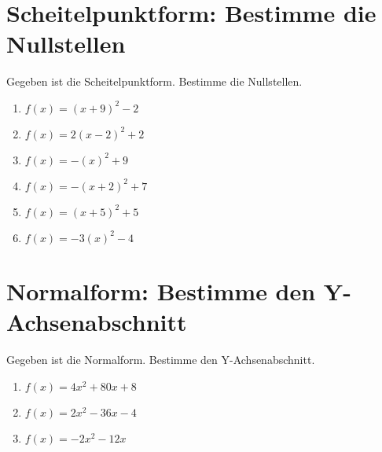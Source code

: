 \documentclass{article}%
\begin{document}
\section{Scheitelpunktform: Bestimme die Nullstellen}%
\label{sec:ScheitelpunktformBestimmedieNullstellen}%
Gegeben ist die Scheitelpunktform. Bestimme die Nullstellen.%
\begin{enumerate}[label=\alph*)]%
\item%
\newline\vspace{0.5cm} $f(x)=(x+9)^2 -2$%
\item%
\newline\vspace{0.5cm} $f(x)=2(x-2)^2 +2$%
\item%
\newline\vspace{0.5cm} $f(x)=-(x)^2 +9$%
\item%
\newline\vspace{0.5cm} $f(x)=-(x+2)^2 +7$%
\item%
\newline\vspace{0.5cm} $f(x)=(x+5)^2 +5$%
\item%
\newline\vspace{0.5cm} $f(x)=-3(x)^2 -4$%
\end{enumerate}

%
\section{Normalform: Bestimme den Y{-}Achsenabschnitt}%
\label{sec:NormalformBestimmedenY{-}Achsenabschnitt}%
Gegeben ist die Normalform. Bestimme den Y{-}Achsenabschnitt.%
\begin{enumerate}[label=\alph*)]%
\item%
\newline\vspace{0.5cm} $f(x)=4x^2 + 80x + 8$%
\item%
\newline\vspace{0.5cm} $f(x)=2x^2 - 36x - 4$%
\item%
\newline\vspace{0.5cm} $f(x)=-2x^2 - 12x$%
\end{enumerate}

%
\end{document}
